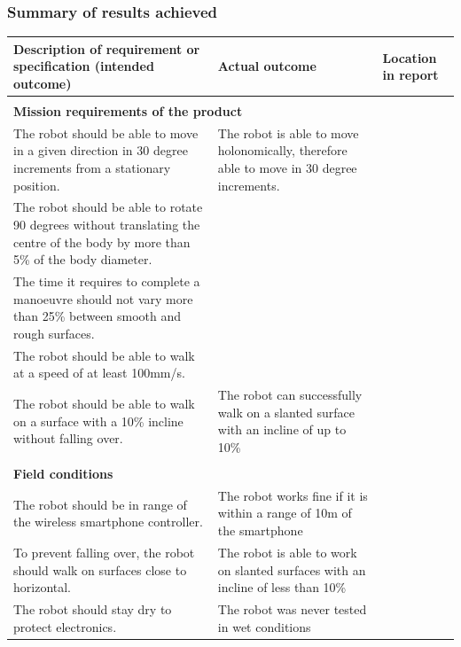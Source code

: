 
\subsubsection{Summary of results achieved}
\begin{table}[H]
\begin{tabular}{|p{5cm}|p{5cm}|p{5cm}|}
\hline
\textbf{Description of requirement or specification
(intended outcome)} & \textbf{Actual outcome}& \textbf{Location in report}\\
\hline
\multicolumn{3}{|l|}{}\\
\multicolumn{3}{|l|}{\textbf{Mission requirements of the product}}\\
\hline

The robot should be able to move in a given direction in 30 degree increments from a stationary position. & The robot is able to move holonomically, therefore able to move in 30 degree increments.&\\\hline

The robot should be able to rotate 90 degrees without translating the centre of the body by more than 5\% of the body diameter.&&\\\hline

The time it requires to complete a manoeuvre should not vary more than 25\% between smooth and rough surfaces.&&\\\hline

The robot should be able to walk at a speed of at least 100mm/s.&&\\\hline

The robot should be able to walk on a surface with a 10\% incline without falling over.&The robot can successfully walk on a slanted surface with an incline of up to 10\% &\\\hline

\multicolumn{3}{|l|}{}\\
\multicolumn{3}{|l|}{\textbf{Field conditions}}\\
\hline
The robot should be in range of the wireless smartphone controller.&The robot works fine if it is within a range of 10m of the smartphone&\\\hline

To prevent falling over, the robot should walk on surfaces close to horizontal.&The robot is able to work on slanted surfaces with an incline of less than 10\%&\\\hline

The robot should stay dry to protect electronics.&The robot was never tested in wet conditions&\\\hline


\end{tabular}
\end{table}
